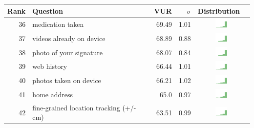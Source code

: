 \begin{table}[t]
\begin{center}
\small
\begin{tabular}{| r | l | r | r | r | r |}
\hline
Rank & Question & VUR & $\sigma$ & Distribution \\
\hline
36 & medication taken & 69.49 & 1.01 & \includegraphics[width = 2cm, height = 0.5cm]{tex-inputs/table-images/learnedwhatmedicationyoutakecombined} \\ 
37 & videos already on device & 68.89 & 0.88 & \includegraphics[width = 2cm, height = 0.5cm]{tex-inputs/table-images/sharedvideosyoutookwhicharealreadyonyourdevicecombined} \\ 
38 & photo of your signature & 68.07 & 0.84 & \includegraphics[width = 2cm, height = 0.5cm]{tex-inputs/table-images/tookapictureofyoursignaturecombined} \\ 
39 & web history & 66.44 & 1.01 & \includegraphics[width = 2cm, height = 0.5cm]{tex-inputs/table-images/learnedwhatwebsitesyougotocombined} \\ 
40 & photos taken on device & 66.21 & 1.02 & \includegraphics[width = 2cm, height = 0.5cm]{tex-inputs/table-images/sharedphotosyoutookwhicharealreadyonyourdevicecombined} \\ 
41 & home address & 65.0 & 0.97 & \includegraphics[width = 2cm, height = 0.5cm]{tex-inputs/table-images/learnedwhereyoulivesomehowcombined} \\ 
42 & fine-grained location tracking (+/- cm) & 63.51 & 0.99 & \includegraphics[width = 2cm, height = 0.5cm]{tex-inputs/table-images/trackedwhereyouareveryaccurately(whereyouareinaroom)combined} \\ 

\end{tabular}
\end{center}
\end{table}
